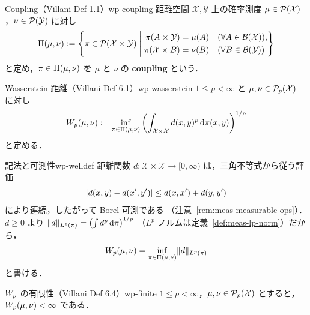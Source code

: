 \begin{definition}{Coupling（Villani Def 1.1）}{wp-coupling}
  距離空間 $\mathcal{X},\mathcal{Y}$ 上の確率測度
  $\mu\in\mathcal{P}(\mathcal{X})$，$\nu\in\mathcal{P}(\mathcal{Y})$ に対し
  \[
    \Pi(\mu,\nu)
    :=
    \left\{
      \pi\in\mathcal{P}(\mathcal{X}\times\mathcal{Y})
      \;\middle|\;
      \begin{aligned}
        \pi(A\times\mathcal{Y})&=\mu(A) &&(\forall A\in\mathcal{B}(\mathcal{X})),\\
        \pi(\mathcal{X}\times B)&=\nu(B) &&(\forall B\in\mathcal{B}(\mathcal{Y}))
      \end{aligned}
    \right\}
  \]
  と定め，$\pi\in\Pi(\mu,\nu)$ を $\mu$ と $\nu$ の
  \textbf{coupling} という．
\end{definition}

\begin{definition}{Wasserstein 距離（Villani Def 6.1）}{wp-wasserstein}
  $1\leq p<\infty$ と $\mu,\nu\in\mathcal{P}_{p}(\mathcal{X})$ に対し
  \[
    W_p(\mu,\nu)
    :=
    \inf_{\pi\in\Pi(\mu,\nu)}
    \left(
      \int_{\mathcal{X}\times \mathcal{X}}d(x,y)^p\,\mathrm{d}\pi(x,y)
    \right)^{1/p}
  \]
  と定める．
\end{definition}

\begin{remark}{記法と可測性}{wp-welldef}
  距離関数 $d\colon \mathcal{X}\times \mathcal{X}\to[0,\infty)$ は，三角不等式から従う評価
  \[
    \lvert d(x,y)-d(x',y') \rvert\leq d(x,x')+d(y,y')
  \]
  により連続，したがって Borel 可測である
  （注意~\ref{rem:meas-measurable-ops}）．
  $d\geq0$ より
  $\lVert d \rVert_{L^p(\pi)}=\bigl(\int d^p\,\mathrm{d}\pi\bigr)^{1/p}$
  （$L^p$ ノルムは定義~\ref{def:meas-lp-norm}）だから，
  \[
    W_p(\mu,\nu)
    =\inf_{\pi\in\Pi(\mu,\nu)}\lVert d \rVert_{L^p(\pi)}
  \]
  と書ける．
\end{remark}

\begin{lemma}{$W_p$ の有限性（Villani Def 6.4）}{wp-finite}
  $1\leq p<\infty$，$\mu,\nu\in\mathcal{P}_{p}(\mathcal{X})$ とすると，
  $W_p(\mu,\nu)<\infty$ である．
\end{lemma}

